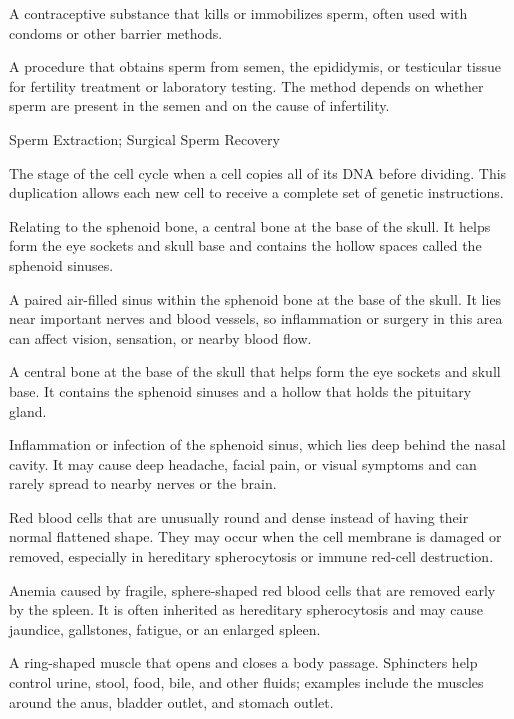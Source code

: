  A contraceptive substance that kills or immobilizes sperm, often used with condoms or other barrier methods.

 A procedure that obtains sperm from semen, the epididymis, or testicular tissue for fertility treatment or laboratory testing. The method depends on whether sperm are present in the semen and on the cause of infertility.

\synonyms
Sperm Extraction; Surgical Sperm Recovery

 The stage of the cell cycle when a cell copies all of its DNA before dividing. This duplication allows each new cell to receive a complete set of genetic instructions.

 Relating to the sphenoid bone, a central bone at the base of the skull. It helps form the eye sockets and skull base and contains the hollow spaces called the sphenoid sinuses.

 A paired air-filled sinus within the sphenoid bone at the base of the skull. It lies near important nerves and blood
vessels, so inflammation or surgery in this area can affect vision, sensation, or nearby blood flow.

 A central bone at the base of the skull that helps form the eye sockets and skull base. It contains the sphenoid sinuses and a hollow that holds the pituitary gland.

 Inflammation or infection of the sphenoid sinus, which lies deep behind the nasal cavity. It may cause
deep headache, facial pain, or visual symptoms and can rarely spread to nearby nerves or the brain.

 Red blood cells that are unusually round and dense instead of having their normal flattened shape. They may occur when the cell membrane is damaged or removed, especially in hereditary spherocytosis or immune red-cell destruction.

 Anemia caused by fragile, sphere-shaped red blood cells that are removed early by the spleen. It is often inherited as hereditary spherocytosis and may cause jaundice, gallstones, fatigue, or an enlarged spleen.

 A ring-shaped muscle that opens and closes a body passage. Sphincters help control urine, stool, food, bile, and other fluids; examples include the muscles around the anus, bladder outlet, and stomach outlet.

